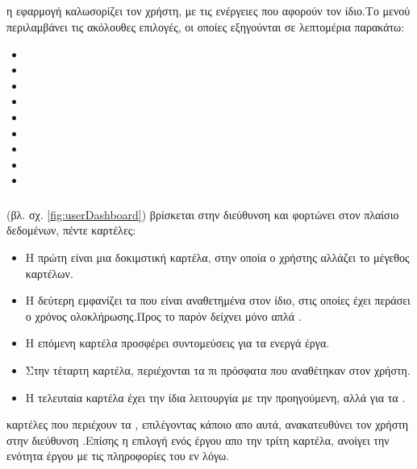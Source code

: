 \subsection{}
 η εφαρμογή καλωσορίζει τον χρήστη, με τις ενέργειες που αφορούν τον ίδιο.Το μενού περιλαμβάνει τις ακόλουθες επιλογές, οι οποίες εξηγούνται σε λεπτομέρια παρακάτω:\\
\begin{itemize}
	\item {}
	\item {}
	\item {}
	\item {}
	\item {}
	\item {}
	\item {}
	\item {}
	\item {}
\end{itemize} 

\subsubsection*{}
  (βλ. σχ. \ref{fig:userDashboard}) βρίσκεται στην διεύθυνση  και φορτώνει στον πλαίσιο δεδομένων, πέντε καρτέλες:
\begin{itemize}
	\item Η πρώτη είναι μια δοκιμστική καρτέλα, στην οποία ο χρήστης αλλάζει το μέγεθος καρτέλων.
	\item Η δεύτερη εμφανίζει τα  που είναι αναθετημένα στον ίδιο, στις οποίες έχει περάσει ο χρόνος ολοκλήρωσης.Προς το παρόν δείχνει μόνο απλά .
	\item Η επόμενη καρτέλα προσφέρει συντομεύσεις για τα ενεργά έργα.
	\item Στην τέταρτη καρτέλα, περιέχονται τα πι πρόσφατα  που αναθέτηκαν στον χρήστη.
	\item Η τελευταία καρτέλα έχει την ίδια λειτουργία με την προηγούμενη, αλλά για τα .
\end{itemize}

 καρτέλες που περιέχουν τα , επιλέγοντας κάποιο απο αυτά, ανακατευθύνει τον χρήστη στην διεύθυνση .Επίσης η επιλογή ενός έργου απο την τρίτη καρτέλα, ανοίγει την ενότητα έργου με τις πληροφορίες του εν λόγω.

